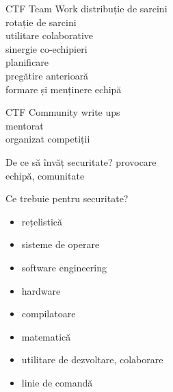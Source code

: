 \documentclass{simple}
\begin{document}
\begin{frame}{CTF Team Work}
  \centering
  \pause
  \vspace{0.5cm}
  \Large{distribuție de sarcini} \\
  \pause
  \vspace{0.5cm}
  \Large{rotație de sarcini} \\
  \pause
  \vspace{0.5cm}
  \Large{utilitare colaborative} \\
  \pause
  \vspace{0.5cm}
  \Large{sinergie co-echipieri} \\
  \pause
  \vspace{0.5cm}
  \Large{planificare} \\
  \pause
  \vspace{0.5cm}
  \Large{pregătire anterioară} \\
  \pause
  \vspace{0.5cm}
  \Large{formare și menținere echipă}
\end{frame}

\begin{frame}{CTF Community}
  \centering
  \pause
  \vspace{0.5cm}
  \Large{write ups} \\
  \pause
  \vspace{0.5cm}
  \Large{mentorat} \\
  \pause
  \vspace{0.5cm}
  \Large{organizat competiții}
\end{frame}

\begin{frame}{De ce să învăț securitate?}
  \centering
  \vspace{0.5cm}
  \Large{provocare} \\
  \pause
  \vspace{0.5cm}
  \Large{echipă, comunitate} \\
\end{frame}

\begin{frame}{Ce trebuie pentru securitate?}
  \begin{itemize}
    \pause
    \item rețelistică
    \pause
    \item sisteme de operare
    \pause
    \item software engineering
    \pause
    \item hardware
    \pause
    \item compilatoare
    \pause
    \item matematică
    \pause
    \item utilitare de dezvoltare, colaborare
    \pause
    \item linie de comandă
  \end{itemize}
\end{frame}
\end{document}
